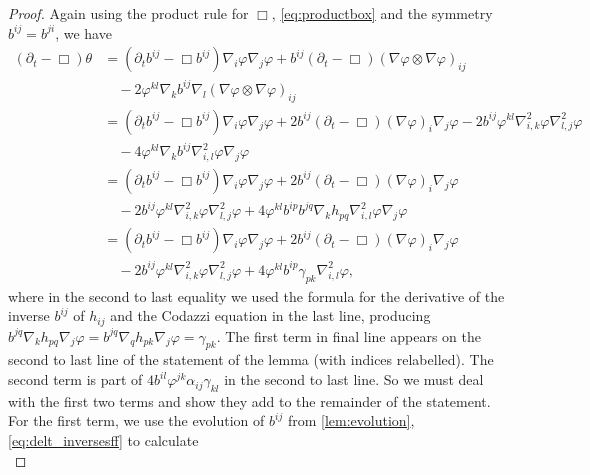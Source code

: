 \documentclass{amsart}
\begin{document}
\begin{proof}
Again using the product rule for \(\Box\), \cref{eq:productbox} and the symmetry \(b^{ij} = b^{ji}\), we have
\begin{equation}
\label{eq:delt_theta}
\begin{split}
(\partial_{t} - \Box)\theta &= (\partial_{t}b^{ij} - \Box b^{ij})\nabla_i \varphi\nabla_j\varphi + b^{ij} (\partial_{t} - \Box) (\nabla\varphi \otimes \nabla\varphi)_{ij} \\
&\quad - 2 \varphi^{kl} \nabla_k b^{ij} \nabla_l (\nabla \varphi \otimes \nabla\varphi)_{ij} \\
&= (\partial_{t}b^{ij} - \Box b^{ij})\nabla_i \varphi\nabla_j\varphi + 2 b^{ij} (\partial_{t} - \Box) (\nabla\varphi)_i \nabla_j\varphi - 2 b^{ij} \varphi^{kl} \nabla^2_{i,k} \varphi \nabla^2_{l,j} \varphi \\
&\quad - 4 \varphi^{kl} \nabla_k b^{ij} \nabla^2_{i,l} \varphi \nabla_j\varphi \\
&= (\partial_{t}b^{ij} - \Box b^{ij})\nabla_i \varphi\nabla_j\varphi + 2 b^{ij} (\partial_{t} - \Box) (\nabla\varphi)_i \nabla_j\varphi \\
&\quad - 2 b^{ij} \varphi^{kl} \nabla^2_{i,k} \varphi \nabla^2_{l,j} \varphi + 4 \varphi^{kl} b^{ip}b^{jq} \nabla_k h_{pq} \nabla^2_{i,l} \varphi \nabla_j\varphi \\
&= (\partial_{t}b^{ij} - \Box b^{ij})\nabla_i \varphi\nabla_j\varphi + 2 b^{ij} (\partial_{t} - \Box) (\nabla\varphi)_i \nabla_j\varphi \\
&\quad - 2 b^{ij} \varphi^{kl} \nabla^2_{i,k} \varphi \nabla^2_{l,j} \varphi + 4 \varphi^{kl} b^{ip}\gamma_{pk} \nabla^2_{i,l} \varphi,
\end{split}
\end{equation}
where in the second to last equality we used the formula for the derivative of the inverse \(b^{ij}\) of \(h_{ij}\) and the Codazzi equation in the last line, producing \(b^{jq} \nabla_k h_{pq} \nabla_j \varphi = b^{jq} \nabla_q h_{pk} \nabla_j \varphi = \gamma_{pk}\). The first term in final line appears on the second to last line of the statement of the lemma (with indices relabelled). The second term is part of \(4 b^{il}\varphi^{jk} \alpha_{ij} \gamma_{kl}\) in the second to last line. So we must deal with the first two terms and show they add to the remainder of the statement. For the first term, we use the evolution of \(b^{ij}\) from \cref{lem:evolution}, \cref{eq:delt_inversesff} to calculate
\begin{equation}
\label{eq:delt_theta1}

\end{equation}
\end{proof}
\end{document}
